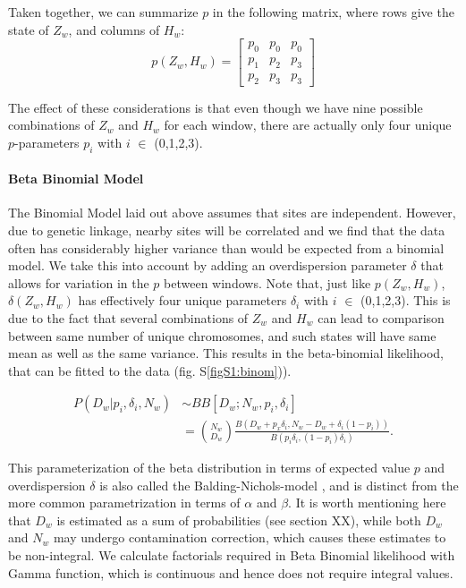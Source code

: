 \documentclass[12pt, letterpaper]{article}
\begin{document}
Taken together, we can summarize $p$ in the following matrix, where rows give the state of $Z_w$, and columns of $H_w$:
\begin{equation}\label{eq:2}
    p(Z_w, H_w) = \left[\begin{array}
{rrr}
p_0 & p_0 & p_0 \\
p_1 & p_2 & p_3 \\
p_2 & p_3 & p_3
\end{array}\right]
\end{equation}


The effect of these considerations is that even though we have nine possible combinations of $Z_w$ and $H_w$ for each window, there are actually only four unique $p$-parameters $p_i$ with $i$ $\in$ (0,1,2,3). 

\paragraph{Beta Binomial Model}
The Binomial Model laid out above assumes that sites are independent. However, due to genetic linkage, nearby sites will be correlated and we find that the data often has considerably higher variance than would be expected from a binomial model. We take this into account by adding an overdispersion parameter $\delta$ that allows for variation in the $p$ between windows. Note that, just like $p(Z_w,H_w)$, $\delta(Z_w,H_w)$ has effectively four unique parameters $\delta_i$ with $i$ $\in$ (0,1,2,3). This is due to the fact that several combinations of $Z_w$ and $H_w$ can lead to comparison between same number of unique chromosomes, and such states will have same mean as well as the same variance. This results in the beta-binomial likelihood, that can be fitted to the data (fig. S\ref{figS1:binom})).  

\begin{align}\label{eq:3}
P(D_{w}|p_i,\delta_i,N_w) &\sim BB[D_w; N_w, p_i, \delta_i] \nonumber\\
&= \binom{N_w}{D_w}\frac{B(D_w+p_x \delta_{i}, N_w-D_w+ \delta_{i}(1-p_{i}))}{ B(p_{i}\delta_{i}, (1-p_{i})\delta_{i})}.
\end{align}

This parameterization of the beta distribution in terms of expected value $p$ and overdispersion $\delta$ is also called the Balding-Nichols-model \cite{balding_method_nodate}, and is distinct from the more common parametrization in terms of $\alpha$ and $\beta$. It is worth mentioning here that $D_w$ is estimated as a sum of probabilities (see section XX), while both $D_w$ and $N_w$ may undergo contamination correction, which causes these estimates to be non-integral. We calculate factorials required in Beta Binomial likelihood with Gamma function, which is continuous and hence does not require integral values.   
\end{document}
